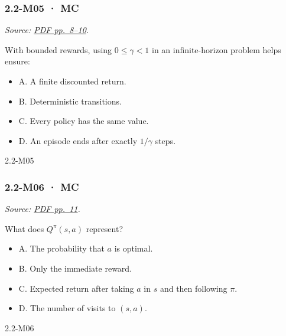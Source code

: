 \noindent\begin{minipage}{\linewidth}

\subsubsection{2.2-M05 · MC}\label{m05-mc-4}

\emph{Source:
\href{../Lecture\%20Slides/2.2.\%20Markov\%20decision\%20processes.pdf\#page=8}{PDF
pp.~8--10}.}

With bounded rewards, using \(0\leq\gamma<1\) in an infinite-horizon
problem helps ensure:

\begin{itemize}
\tightlist
\item
  A. A finite discounted return.
\item
  B. Deterministic transitions.
\item
  C. Every policy has the same value.
\item
  D. An episode ends after exactly \(1/\gamma\) steps.
\end{itemize}

\begin{solution}[8mm]{2.2-M05}

\end{solution}
\end{minipage}\par\medskip

\noindent\begin{minipage}{\linewidth}

\subsubsection{2.2-M06 · MC}\label{m06-mc-4}

\emph{Source:
\href{../Lecture\%20Slides/2.2.\%20Markov\%20decision\%20processes.pdf\#page=11}{PDF
pp.~11}.}

What does \(Q^\pi(s,a)\) represent?

\begin{itemize}
\tightlist
\item
  A. The probability that \(a\) is optimal.
\item
  B. Only the immediate reward.
\item
  C. Expected return after taking \(a\) in \(s\) and then following
  \(\pi\).
\item
  D. The number of visits to \((s,a)\).
\end{itemize}

\begin{solution}[8mm]{2.2-M06}

\end{solution}
\end{minipage}\par\medskip

